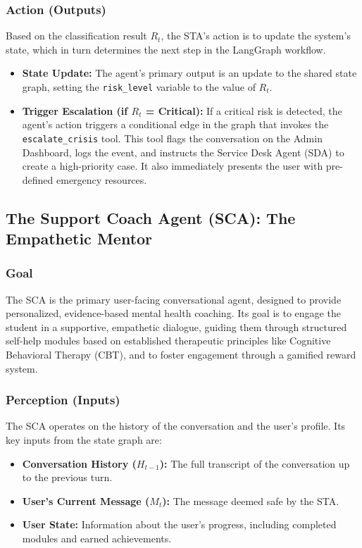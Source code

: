 \subsubsection{Action (Outputs)}
Based on the classification result $R_t$, the STA's action is to update the system's state, which in turn determines the next step in the LangGraph workflow.
\begin{itemize}
    \item \textbf{State Update:} The agent's primary output is an update to the shared state graph, setting the \texttt{risk\_level} variable to the value of $R_t$.
    \item \textbf{Trigger Escalation (if $R_t$ = Critical):} If a critical risk is detected, the agent's action triggers a conditional edge in the graph that invokes the \texttt{escalate\_crisis} tool. This tool flags the conversation on the Admin Dashboard, logs the event, and instructs the Service Desk Agent (SDA) to create a high-priority case. It also immediately presents the user with pre-defined emergency resources.
\end{itemize}

\subsection{The Support Coach Agent (SCA): The Empathetic Mentor}

\subsubsection{Goal}
The SCA is the primary user-facing conversational agent, designed to provide personalized, evidence-based mental health coaching. Its goal is to engage the student in a supportive, empathetic dialogue, guiding them through structured self-help modules based on established therapeutic principles like Cognitive Behavioral Therapy (CBT), and to foster engagement through a gamified reward system.

\subsubsection{Perception (Inputs)}
The SCA operates on the history of the conversation and the user's profile. Its key inputs from the state graph are:
\begin{itemize}
    \item \textbf{Conversation History ($H_{t-1}$):} The full transcript of the conversation up to the previous turn.
    \item \textbf{User's Current Message ($M_t$):} The message deemed safe by the STA.
    \item \textbf{User State:} Information about the user's progress, including completed modules and earned achievements.
\end{itemize}

